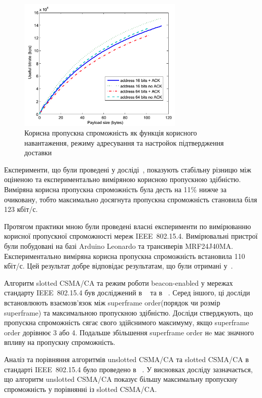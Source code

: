\documentclass[a4paper,ukrainian,utf8,nocolumnsxix,floatsection,equationsection]{eskdtext}
\newcommand{\longcaption}[1]{\captionsetup{style=figureLongCaption}\caption{#1}}
\newcommand{\iee}[0]{IEEE~802.15.4\xspace}
\newcommand{\csma}[0]{CSMA/CA\xspace}
\newcommand{\ucsma}[0]{unslotted \csma\xspace}
\newcommand{\scsma}[0]{slotted \csma\xspace}
\newcommand{\bem}[0]{beacon-enabled\xspace}
\begin{document}
\begin{figure}[bth]
	\centering
	\includegraphics[width=0.7\textwidth]{img/throughput_graph.png}
	\longcaption{\label{fig:throughput_graph}Корисна пропускна спроможність як функція корисного навантаження, режиму адресування та настройок підтвердження доставки}
\end{figure}

Експерименти, що були проведені у досліді~\cite{thoroughput:analysis:unslotted:ieee}, показують стабільну різницю між оціненою та експериментально виміряною корисною пропускною здібністю. Виміряна корисна пропускна спроможність була десть на 11\% нижче за очиковану, тобто максимально досягнута пропускна спроможність становила біля 123 кбіт/с.

Протягом практики мною були проведені власні експерименти по вимірюванню корисної пропускної спроможності мереж \iee. Вимірювальні пристрої були побудовані на базі Arduino Leonardo та трансиверів MRF24J40MA. Експериментально виміряна корисна пропускна спроможність встановила 110 кбіт/с. Цей результат добре відповідає результатам, що були отримані у~\cite{thoroughput:analysis:unslotted:ieee}.

Алгоритм \scsma та режим роботи \bem у мережах стандарту \iee був досліджений в ~\cite{simulation:study:slotted:ieee} та в ~\cite{gts:allocation:analysis}. Серед іншого, ці досліди встановлюють взаємозв'язок між superframe order(порядок чи розмір superframe) та максимальною пропускною здібністю. Досліди стверджують, що пропускна спроможність сягає свого здійснимого максимуму, якщо superframe order дорівнює 3 або 4. Подальше збільшення superframe order нe має значного впливу на пропускну спроможність.

Аналіз та порівняння алгоритмів \ucsma та \scsma в стандарті \iee було проведено в ~\cite{analysis:slotted:unslotted}. У висновках досліду зазначається, що алгоритм \ucsma  показує більшу максимальну пропускну спроможність у порівнянні із \scsma.
\end{document}
